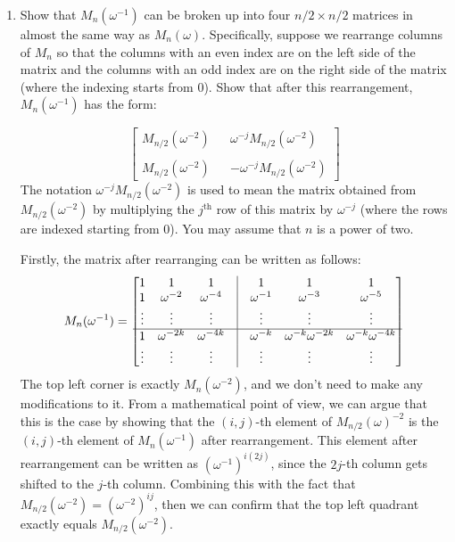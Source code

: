 \documentclass[11pt]{article}
\begin{document}
\begin{enumerate}[label=(\alph*), resume]
 \item
 Show that $M_n(\omega^{-1})$ can be broken up into four $n/2 \times n/2$ matrices in almost the same way as $M_n(\omega)$. Specifically, suppose we rearrange columns of $M_n$ so that the columns with an even index are on the left side of the matrix and the columns with an odd index are on the right side of the matrix (where the indexing starts from 0). Show that after this rearrangement, $M_n(\omega^{-1})$ has the form:

 \[
 \left[
 \begin{array}{ccc}
 M_{n/2}(\omega^{-2}) & & \omega^{-j}M_{n/2}(\omega^{-2}) \\
                    & & \\
 M_{n/2}(\omega^{-2}) & & -\omega^{-j}M_{n/2}(\omega^{-2})
 \end{array}
 \right]
 \]
 The notation $\omega^{-j}M_{n/2}(\omega^{-2})$ is used to mean the matrix obtained from $M_{n/2}(\omega^{-2})$ by multiplying the $j^\text{th}$ row of this matrix by $\omega^{-j}$ (where the rows are indexed starting from 0). You may assume that $n$ is a power of two.

 \begin{solution}
	 Firstly, the matrix after rearranging can be written as follows:
	\[
		M_n(\omega^{-1}) = \begin{bmatrix} 1 & 1 & 1 & \vline & 1 & 1 & 1\\ 
			1 & \omega^{-2} & \omega^{-4} &\vline& \omega^{-1} & \omega^{-3} & \omega^{-5} \\
	\vdots & \vdots & \vdots & \vline & \vdots & \vdots & \vdots \\
	\hline 
	1 & \omega^{-2k} & \omega^{-4k} & \vline & \omega^{-k} & \omega^{-k} \omega^{-2k} & \omega^{-k} \omega^{-4k} \\ 
\vdots & \vdots & \vdots & \vline & \vdots & \vdots & \vdots\end{bmatrix} 
	\] 
	The top left corner is exactly $M_n(\omega^{-2})$, and we don't need to make any modifications to it. From
	a mathematical point of view, we can argue that this is the case by showing that the $(i, j)$-th element 
	of $M_{n / 2}(\omega)^{-2}$ is the $(i,j)$-th element of $M_n(\omega^{-1})$ after rearrangement. This 
	element after rearrangement can be written as $(\omega^{-1})^{i (2j)}$, since the $2j$-th column gets shifted
	to the $j$-th column. Combining this with the fact that $M_{n / 2}(\omega^{-2}) = (\omega^{-2})^{ij}$, 
	then we can confirm that the top left quadrant exactly equals $M_{n / 2}(\omega^{-2})$. 


\end{solution}
\end{enumerate}
\end{document}
